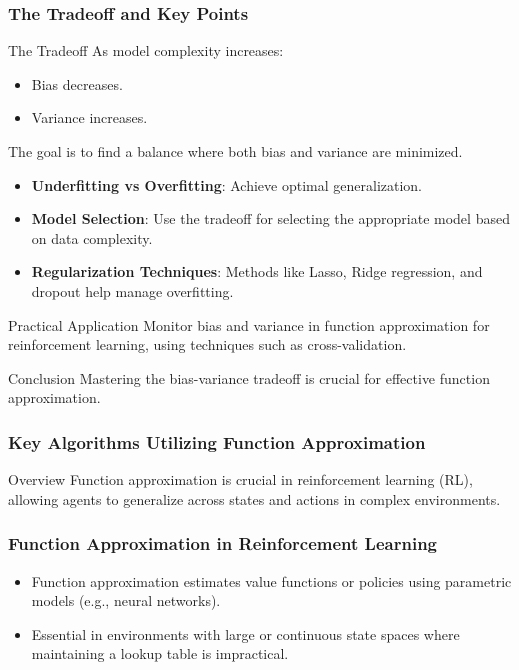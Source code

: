 \documentclass[aspectratio=169]{beamer}
\begin{document}
\begin{frame}[fragile]
    \frametitle{The Tradeoff and Key Points}
    \begin{block}{The Tradeoff}
        As model complexity increases:
        \begin{itemize}
            \item Bias decreases.
            \item Variance increases.
        \end{itemize}
        The goal is to find a balance where both bias and variance are minimized.
    \end{block}

    \begin{itemize}
        \item \textbf{Underfitting vs Overfitting}: Achieve optimal generalization.
        \item \textbf{Model Selection}: Use the tradeoff for selecting the appropriate model based on data complexity.
        \item \textbf{Regularization Techniques}: Methods like Lasso, Ridge regression, and dropout help manage overfitting.
    \end{itemize}

    \begin{block}{Practical Application}
        Monitor bias and variance in function approximation for reinforcement learning, using techniques such as cross-validation.
    \end{block}

    \begin{block}{Conclusion}
        Mastering the bias-variance tradeoff is crucial for effective function approximation.
    \end{block}
\end{frame}

\begin{frame}[fragile]
  \frametitle{Key Algorithms Utilizing Function Approximation}
  \begin{block}{Overview}
    Function approximation is crucial in reinforcement learning (RL), allowing agents to generalize across states and actions in complex environments.
  \end{block}
\end{frame}

\begin{frame}[fragile]
  \frametitle{Function Approximation in Reinforcement Learning}
  \begin{itemize}
    \item Function approximation estimates value functions or policies using parametric models (e.g., neural networks).
    \item Essential in environments with large or continuous state spaces where maintaining a lookup table is impractical.
  \end{itemize}
\end{frame}
\end{document}

